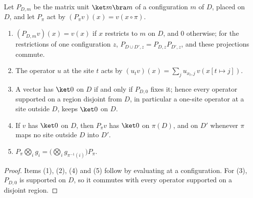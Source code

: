 \begin{lemma}
    \label{lem:teleport_site_operators}
    \leanok
    Let $P_{D,m}$ be the matrix unit $\ket m\bra m$ of a configuration $m$ of
    $D$, placed on $D$, and let $P_\pi$ act by $(P_\pi v)(x)=v(x\circ\pi)$.
    \begin{enumerate}
        \item $(P_{D,m}v)(x)=v(x)$ if $x$ restricts to $m$ on $D$, and $0$
              otherwise; for the restrictions of one configuration $z$,
              $P_{D\cup D',z}=P_{D,z}P_{D',z}$, and these projections commute.
        \item The operator $u$ at the site $t$ acts by
              $(u_tv)(x)=\sum_ju_{x_t,j}\,v(x[t\mapsto j])$.
        \item A vector has $\ket0$ on $D$ if and only if $P_{D,0}$ fixes it;
              hence every operator supported on a region disjoint from $D$, in
              particular a one-site operator at a site outside $D$, keeps
              $\ket0$ on $D$.
        \item If $v$ has $\ket0$ on $D$, then $P_\pi v$ has $\ket0$ on $\pi(D)$,
              and on $D'$ whenever $\pi$ maps no site outside $D$ into $D'$.
        \item $P_\pi\bigotimes_ig_i=\bigl(\bigotimes_ig_{\pi^{-1}(i)}\bigr)P_\pi$.
    \end{enumerate}
\end{lemma}
\begin{proof}
    \leanok
    Items (1), (2), (4) and (5) follow by evaluating at a configuration. For
    (3), $P_{D,0}$ is supported on $D$, so it commutes with every operator
    supported on a disjoint region.
\end{proof}

